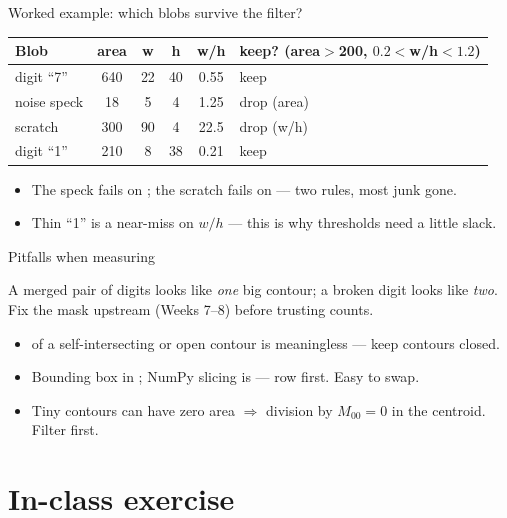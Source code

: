 \documentclass[10pt,aspectratio=169]{beamer}
\begin{document}
\begin{frame}{Worked example: which blobs survive the filter?}
  \begin{center}\scriptsize
  \begin{tabular}{@{}lccccl@{}}
    \toprule
    Blob & area & w & h & w/h & keep? (area$>$200, $0.2<$w/h$<1.2$)\\
    \midrule
    digit ``7''   & 640 & 22 & 40 & 0.55 & \textcolor{courseGood}{keep} \\
    noise speck   & 18  & 5  & 4  & 1.25 & \textcolor{courseBad}{drop (area)} \\
    scratch       & 300 & 90 & 4  & 22.5 & \textcolor{courseBad}{drop (w/h)} \\
    digit ``1''   & 210 & 8  & 38 & 0.21 & \textcolor{courseGood}{keep} \\
    \bottomrule
  \end{tabular}
  \end{center}
  \begin{itemize}
    \item The speck fails on ; the scratch fails on  — two rules, most junk gone.
    \item Thin ``1'' is a near-miss on $w/h$ — this is why thresholds need a little slack.
  \end{itemize}
\end{frame}

\begin{frame}{Pitfalls when measuring}
  \begin{badbox}
    A merged pair of digits looks like \emph{one} big contour; a broken digit looks like \emph{two}.
    Fix the mask upstream (Weeks 7--8) before trusting counts.
  \end{badbox}
  \begin{itemize}
    \item {} of a self-intersecting or open contour is meaningless — keep contours closed.
    \item Bounding box in ; NumPy slicing is \code{[y:y+h, x:x+w]} — row first. Easy to swap.
    \item Tiny contours can have zero area $\Rightarrow$ division by $M_{00}=0$ in the centroid. Filter first.
  \end{itemize}
\end{frame}

\section{In-class exercise}
\end{document}
